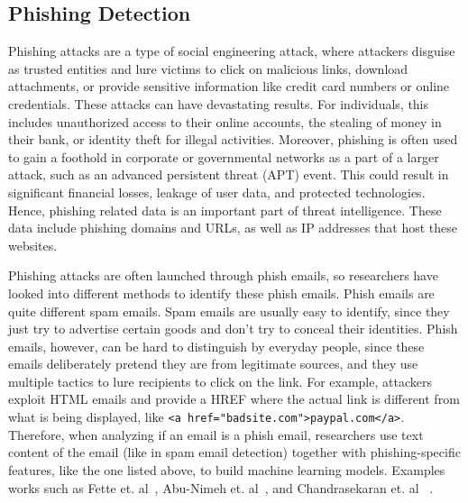 \subsection{Phishing Detection}
Phishing attacks are a type of social engineering attack, where attackers 
disguise as trusted entities and lure victims to click on malicious links, 
download attachments, or provide sensitive information like credit card
numbers or online credentials. These attacks can have devastating results. 
For individuals, this includes unauthorized access to their online 
accounts, the stealing of money in their bank, or identity theft for illegal
activities. Moreover, phishing is often used to gain a foothold in corporate 
or governmental networks as a part of a larger attack, such as an 
advanced persistent threat (APT) event. This could result in significant
financial losses, leakage of user data, and protected technologies. Hence,
phishing related data is an important part of threat intelligence. These data
include phishing domains and URLs, as well as IP addresses that host these
websites. 

Phishing attacks are often launched through phish emails, so researchers
have looked into different methods to identify these phish emails. Phish emails
are quite different spam emails. Spam emails are usually easy to identify,
since they just try to advertise certain goods and don't try to conceal 
their identities. Phish emails, however, can be hard to distinguish by 
everyday people, since these emails deliberately pretend they are
from legitimate sources, and they use multiple tactics to lure recipients
to click on the link. For example, attackers exploit HTML emails and
provide a HREF where the actual link is different from what is being 
displayed, like \texttt{<a href="badsite.com">paypal.com</a>}. Therefore,
when analyzing if an email is a phish email, researchers use text content
of the email (like in spam email detection) together with phishing-specific 
features, like the one listed above, to build machine learning models. 
Examples works such as Fette et. al~\cite{fette2007learning}, Abu-Nimeh 
et. al~\cite{abu2007comparison}, and Chandrasekaran et. al
~\cite{chandrasekaran2006phishing}.

